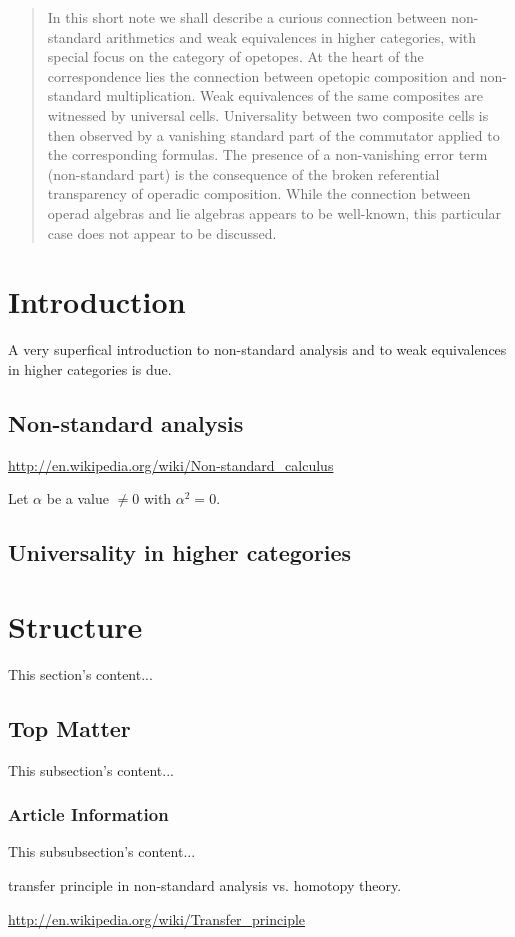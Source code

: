\documentclass{article}
\begin{document}
\begin{abstract}
In this short note we shall describe a curious connection
between non-standard arithmetics and weak equivalences
in higher categories, with special focus on the category of
opetopes. At the heart of the correspondence lies the
connection between opetopic composition and non-standard
multiplication. Weak equivalences of the same composites are
witnessed by universal cells. Universality between two
composite cells is then observed by a vanishing standard
part of the commutator applied to the corresponding formulas.
The presence of a non-vanishing error term (non-standard part)
is the consequence of the broken referential transparency of
operadic composition.
While the connection between operad algebras and
lie algebras appears to be well-known, this particular
case does not appear to be discussed.
\end{abstract}

\section{Introduction}
A very superfical introduction to non-standard analysis
and to weak equivalences in higher categories is due.

\subsection{Non-standard analysis}

\url{http://en.wikipedia.org/wiki/Non-standard_calculus}

Let $\alpha$ be a value $\neq 0$ with $\alpha^2 = 0$.

\subsection{Universality in higher categories}

\section{Structure}
This section's content...

\subsection{Top Matter}
This subsection's content...

\subsubsection{Article Information}
This subsubsection's content...


transfer principle in non-standard analysis vs. homotopy theory.

\url{http://en.wikipedia.org/wiki/Transfer_principle}
\end{document}
